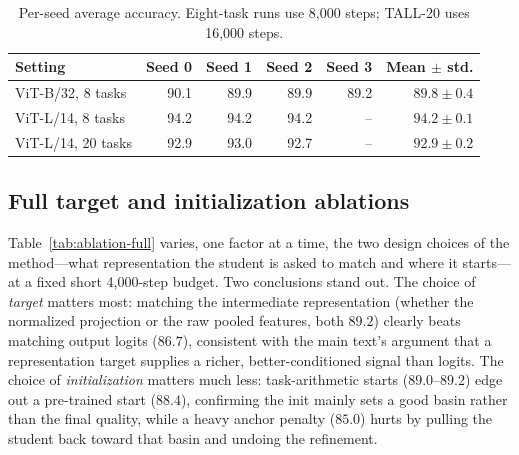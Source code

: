 \documentclass[letterpaper]{article} %
\theoremstyle{plain}
\theoremstyle{definition}
\begin{document}
\begin{table}[tb]
\centering
{\small
\begin{tabular}{lrrrrr}
\toprule
Setting & Seed 0 & Seed 1 & Seed 2 & Seed 3 & Mean $\pm$ std. \\
\midrule
ViT-B/32, 8 tasks & 90.1 & 89.9 & 89.9 & 89.2 & $89.8\pm0.4$ \\
ViT-L/14, 8 tasks & 94.2 & 94.2 & 94.2 & -- & $94.2\pm0.1$ \\
ViT-L/14, 20 tasks & 92.9 & 93.0 & 92.7 & -- & $92.9\pm0.2$ \\
\bottomrule
\end{tabular}
}
\caption{Per-seed average accuracy. Eight-task runs use 8,000 steps; TALL-20 uses
16,000 steps.}
\label{tab:seeds}
\end{table}

\subsection{Full target and initialization ablations}
\label{app:ablation}
Table~\ref{tab:ablation-full} varies, one factor at a time, the two design choices of the method---what representation the student is asked to match and where it starts---at a fixed short 4,000-step budget.
Two conclusions stand out.
The choice of \emph{target} matters most: matching the intermediate representation (whether the normalized projection or the raw pooled features, both $89.2$) clearly beats matching output logits ($86.7$), consistent with the main text's argument that a representation target supplies a richer, better-conditioned signal than logits.
The choice of \emph{initialization} matters much less: task-arithmetic starts ($89.0$--$89.2$) edge out a pre-trained start ($88.4$), confirming the init mainly sets a good basin rather than the final quality, while a heavy anchor penalty ($85.0$) hurts by pulling the student back toward that basin and undoing the refinement.
\end{document}
